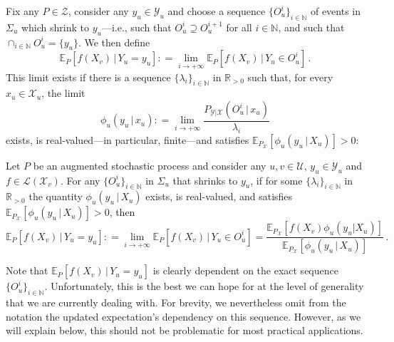 \documentclass[twoside,11pt]{article}
\newcommand{\nats}{\mathbb{N}}
\newcommand{\reals}{\mathbb{R}}
\newcommand{\realspos}{\reals_{>0}}
\newcommand{\states}{\mathcal{X}}
\newcommand{\observs}{\mathcal{Y}}
\newcommand{\gambles}{\mathcal{L}}
\newcommand{\coloneqq}{:\!=}
\begin{document}
Fix any $P\in\mathcal{Z}$, consider any $y_u\in\observs_u$ and choose a sequence $\{O_u^i\}_{i\in\nats}$ of events in $\Sigma_u$ which shrink to $y_u$---i.e., such that $O_u^i\supseteq O_u^{i+1}$ for all $i\in\nats$, and such that $\cap_{i\in\nats} O_u^i=\{y_u\}$. We then define
\begin{equation}\label{eq:def:precise_updated_limit}
\mathbb{E}_P[f(X_v)\,\vert\,Y_u=y_u] \coloneqq \lim_{i\to+\infty} \mathbb{E}_P[f(X_v)\,\vert\,Y_u\in O_u^i]\,.
\end{equation}
This limit exists if there is a sequence $\{\lambda_i\}_{i\in\nats}$ in $\realspos$ such that, for every $x_u\in\states_u$, the limit
\begin{equation*}
\phi_u(y_u\,\vert\, x_u) \coloneqq \lim_{i\to+\infty}\frac{P_{\observs\vert\states}(O_u^i\,\vert\, x_u)}{\lambda_i}
\end{equation*}
exists, is real-valued---in particular, finite---and satisfies $\mathbb{E}_{P_\states}[\phi_u(y_u\,\vert\,X_u)]>0$:
\begin{proposition}\label{prop:precise_bayes_rule_densities}
Let $P$ be an augmented stochastic process and consider any $u,v\in\mathcal{U}$, $y_u\in\observs_u$ and $f\in\gambles(\states_v)$. For any $\{O_u^i\}_{i\in\nats}$ in $\Sigma_u$ that shrinks to $y_u$, if for some $\{\lambda_i\}_{i\in\nats}$ in $\realspos$ the quantity $\phi_u(y_u\,\vert\,X_u)$ exists, is real-valued, and satisfies $\mathbb{E}_{P_\states}[\phi_u(y_u\,\vert\,X_u)]>0$, then
\begin{equation}\label{eq:updated_expectation_is_limit}
\mathbb{E}_P[f(X_v)\,\vert\,Y_u=y_u] \coloneqq \lim_{i\to+\infty} \mathbb{E}_P[f(X_v)\,\vert\,Y_u\in O_u^i] = \frac{\mathbb{E}_{P_\states}[f(X_v)\phi_u(y_u\vert X_u)]}{\mathbb{E}_{P_\states}[\phi_u(y_u\,\vert\,X_u)]}\,.
\end{equation}
\end{proposition}
Note that $\mathbb{E}_P[f(X_v)\,\vert\,Y_u=y_u]$ is clearly dependent on the exact sequence $\{O_u^i\}_{i\in\nats}$. Unfortunately, this is the best we can hope for at the level of generality that we are currently dealing with. 
For brevity, we nevertheless omit from the notation the updated expectation's dependency on this sequence. However, as we will explain below, this should not be problematic for most practical applications.
\end{document}

